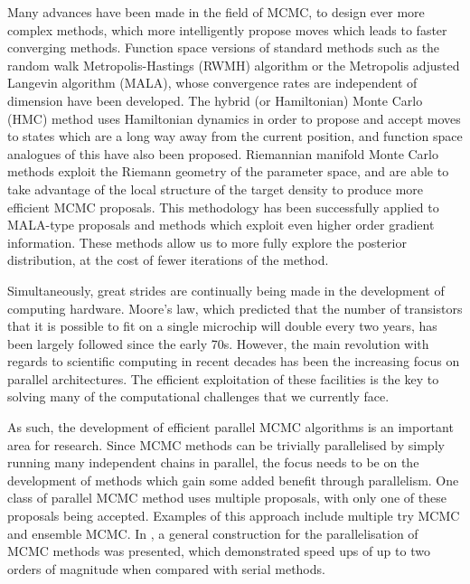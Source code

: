 \documentclass[final]{siamltex}
\begin{document}
Many advances have been made in the field of MCMC, to design ever more
complex methods, which more intelligently propose moves which leads to
faster converging methods. Function space versions of standard methods
such as the random walk Metropolis-Hastings (RWMH) algorithm or the
Metropolis adjusted Langevin algorithm (MALA), whose convergence rates
are independent of dimension have been
developed\cite{cotter2013mcmc}. The hybrid (or Hamiltonian) Monte
Carlo (HMC) method uses Hamiltonian dynamics in order to propose and
accept moves to states which are a long way away from the current
position\cite{sexton1992hamiltonian}, and function space analogues of
this have also been proposed\cite{beskos2011hybrid}. Riemannian
manifold Monte Carlo methods exploit the Riemann geometry of the
parameter space, and are able to take advantage of the local structure
of the target density to produce more efficient MCMC
proposals\cite{girolami2011riemann}. This methodology has been
successfully applied to MALA-type proposals and methods which exploit
even higher order gradient information\cite{bui2014solving}.  These
methods allow us to more fully explore the posterior distribution, at
the cost of fewer iterations of the method.

Simultaneously, great strides are continually being made in the
development of computing hardware. Moore's law, which predicted that
the number of transistors that it is possible to fit on a single
microchip will double every two years, has been largely followed
since the early 70s\cite{moore1998cramming}. However, the main revolution with regards to
scientific computing in recent decades has been the increasing focus on parallel
architectures. The efficient exploitation of these facilities is the key to
solving many of the computational challenges that we currently face.

As such, the development of efficient parallel MCMC algorithms is an
important area for research. Since MCMC methods can be trivially
parallelised by simply running many independent chains in parallel,
the focus needs to be on the development of methods which gain some
added benefit through parallelism. One class of parallel MCMC method
uses multiple proposals, with only one of these proposals being
accepted. Examples of this approach include multiple try
MCMC\cite{liu2000multiple} and ensemble MCMC\cite{neal2011mcmc}. In
\cite{calderhead2014general}, a general construction for the
parallelisation of MCMC methods was presented, which demonstrated
speed ups of up to two orders of magnitude when compared with serial methods.
\end{document}
